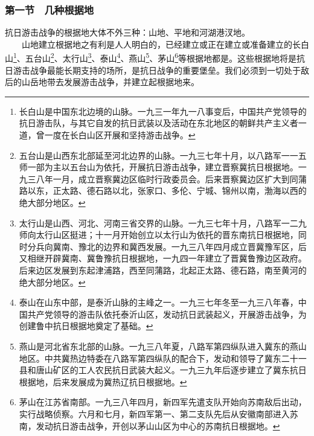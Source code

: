 \documentclass[cn,11pt,chinese]{elegantbook}
\def\myformat#1{\hfil\hfil #1}
\begin{document}
\subsubsection*{\myformat{第一节　几种根据地}}
抗日游击战争的根据地大体不外三种：山地、平地和河湖港汊地。\\
　　山地建立根据地之有利是人人明白的，已经建立或正在建立或准备建立的长白山\footnote[1]{ 长白山是中国东北边境的山脉。一九三一年九一八事变后，中国共产党领导的抗日游击队，与其它自发的抗日武装以及活动在东北地区的朝鲜共产主义者一道，曾一度在长白山区开展和坚持游击战争。}、五台山\footnote[2]{ 五台山是山西东北部延至河北边界的山脉。一九三七年十月，以八路军一一五师一部为主以五台山为依托，开展抗日游击战争，建立晋察冀抗日根据地。一九三八年一月，成立晋察冀边区临时行政委员会。后来晋察冀边区扩大到同蒲路以东，正太路、德石路以北，张家口、多伦、宁城、锦州以南，渤海以西的绝大部分地区。}、太行山\footnote[3]{ 太行山是山西、河北、河南三省交界的山脉。一九三七年十月，八路军一二九师向太行山区挺进；十一月开始创立以太行山为依托的晋东南抗日根据地，同时分兵向冀南、豫北的边界和冀西发展。一九三八年四月成立晋冀豫军区，后又相继开辟冀南、冀鲁豫抗日根据地，一九四一年建立了晋冀鲁豫边区政府。后来边区发展到东起津浦路，西至同蒲路，北起正太路、德石路，南至黄河的绝大部分地区。}、泰山\footnote[4]{ 泰山在山东中部，是泰沂山脉的主峰之一。一九三七年冬至一九三八年春，中国共产党领导的游击队依托泰沂山区，发动抗日武装起义，开展游击战争，为创建鲁中抗日根据地奠定了基础。}、燕山\footnote[5]{ 燕山是河北省东北部的山脉。一九三八年夏，八路军第四纵队进入冀东的燕山地区。中共冀热边特委在八路军第四纵队的配合下，发动和领导了冀东二十一县和唐山矿区的工人农民抗日武装大起义。一九三九年后逐步建立了冀东抗日根据地，后来发展成为冀热辽抗日根据地。}、茅山\footnote[6]{ 茅山在江苏省南部。一九三八年四月，新四军先遣支队开始向苏南敌后出动，实行战略侦察。六月和七月，新四军第一、第二支队先后从安徽南部进入苏南，发动抗日游击战争，开创以茅山山区为中心的苏南抗日根据地。}等根据地都是。这些根据地将是抗日游击战争最能长期支持的场所，是抗日战争的重要堡垒。我们必须到一切处于敌后的山岳地带去发展游击战争，并建立起根据地来。\\
\end{document}
